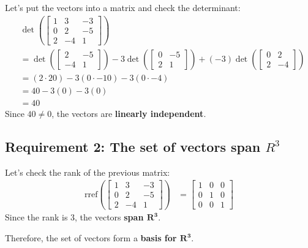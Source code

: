 \documentclass[
  letterpaper,
  DIV=11,
  numbers=noendperiod]{scrartcl}
\begin{document}
Let's put the vectors into a matrix and check the determinant:
\begin{align*}
&\det\left(\begin{bmatrix}1 & 3 & -3 \\ 0 & 2 & -5 \\ 2 & -4 & 1 \end{bmatrix}\right) \\
&= \det\left(\begin{bmatrix}2 & -5 \\ -4 & 1\end{bmatrix}\right)-3\det\left(\begin{bmatrix}0 & -5 \\ 2 & 1\end{bmatrix}\right) + (-3)\det\left(\begin{bmatrix}0 & 2 \\ 2 & -4\end{bmatrix}\right) \\
&= (2\cdot 20)-3(0\cdot -10)-3(0\cdot -4) \\
&= 40-3(0)-3(0) \\
&= 40
\end{align*} Since \(40 \ne 0\), the vectors are \textbf{linearly
independent}.

\hypertarget{requirement-2-the-set-of-vectors-span-r3}{%
\subsection{\texorpdfstring{Requirement 2: The set of vectors span
\(R^3\)}{Requirement 2: The set of vectors span R\^{}3}}\label{requirement-2-the-set-of-vectors-span-r3}}

Let's check the rank of the previous matrix: \begin{align*}
\mathrm{rref}\left(\begin{bmatrix}1 & 3 & -3 \\ 0 & 2 & -5 \\ 2 & -4 & 1 \end{bmatrix}\right) &= \begin{bmatrix}1 & 0 & 0 \\ 0 & 1 & 0 \\ 0 & 0 & 1 \end{bmatrix}
\end{align*} Since the rank is 3, the vectors \textbf{span
\(\symbf{R^3}\)}.

Therefore, the set of vectors form a \textbf{basis for \(\symbf{R^3}\)}.
\end{document}
